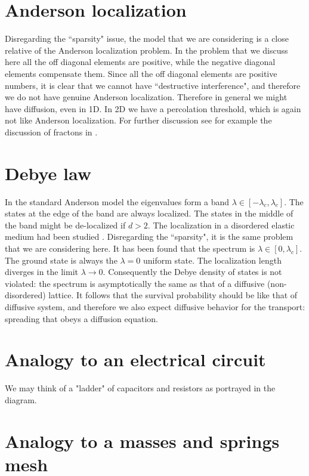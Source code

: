 \section{Anderson localization}
Disregarding the ``sparsity" issue, the model that we are considering 
is a close relative of the Anderson localization problem.
In the problem that we discuss here all the off diagonal elements 
are positive, while the negative diagonal elements compensate them.
%
Since all the  off diagonal elements are positive numbers, 
it is clear that we cannot have ``destructive interference", 
and therefore we do not have genuine Anderson localization. 
Therefore in general we might have diffusion, even in 1D. 
In 2D we have a percolation threshold, which is again 
not like Anderson localization. For further discussion see 
for example the discussion of fractons in \cite{havlin_diffusion_1987}.


\section{Debye law}
In the standard Anderson model the eigenvalues form 
a band ${\lambda \in [-\lambda_c,\lambda_c]}$.
The states at the edge of the band are always localized.
The states in the middle of the band might be de-localized if ${d>2}$.  
%
The localization in a disordered elastic medium had been 
studied \cite{loc}. Disregarding the ``sparsity",  
it is the same problem that we are considering here.
It has been found that the spectrum is ${\lambda \in [0,\lambda_c]}$.
The ground state is always the ${\lambda=0}$ uniform state.
The localization length diverges in the limit ${\lambda \rightarrow 0}$.
Consequently the Debye density of states is not violated:
the spectrum is asymptotically the same as that of a 
diffusive (non-disordered) lattice. It follows that the 
survival probability should be like that of diffusive 
system, and therefore we also expect diffusive behavior
for the transport: spreading that obeys a diffusion equation.


\section{Analogy to an electrical circuit}

We may think of a "ladder" of capacitors and resistors as portrayed in the diagram.



\section{Analogy to a masses and springs mesh} 

